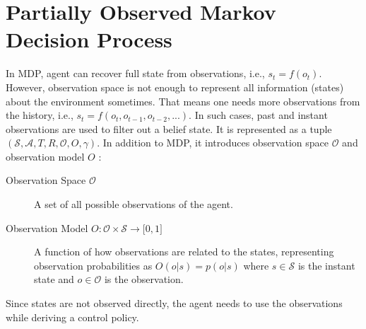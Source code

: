 \section{Partially Observed Markov Decision Process}
\label{sec:pomdp}

In MDP, agent can recover full state from observations, i.e., $s_t=f(o_t)$. 
However, observation space is not enough to represent all information (states) about the environment sometimes. 
That means one needs more observations from the history, i.e., $s_t=f(o_t, o_{t-1}, o_{t-2}, ...)$.
In such cases, past and instant observations are used to filter out a belief state. 
It is represented as a tuple $(\mathcal{S},\mathcal{A},T,R,\mathcal{O},O,\gamma)$. 
In addition to MDP, it introduces observation space $\mathcal{O}$ and observation model $O$ \cite{francois-lavet_introduction_2018}: 

\begin{description}
	\item[Observation Space $\mathcal{O}$] A set of all possible observations of the agent.
	\item[Observation Model $O \colon \mathcal{O} \times \mathcal{S} \rightarrow \lbrack 0,1 \rbrack$] A function of how observations are related to the states, 
	representing observation probabilities as $O(o|s) = p(o|s)$ 
	where $s \in \mathcal{S}$ is the instant state and $o \in \mathcal{O}$ is the observation.
\end{description}

Since states are not observed directly, the agent needs to use the observations while deriving a control policy. 